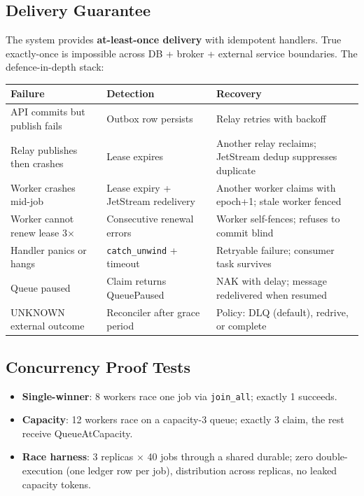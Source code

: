 \documentclass[11pt,a4paper]{article}
\begin{document}
\subsection{Delivery Guarantee}

The system provides \textbf{at-least-once delivery} with idempotent handlers.
True exactly-once is impossible across DB + broker + external service
boundaries. The defence-in-depth stack:

\begin{table}[h]
\centering
\begin{tabular}{p{4.5cm}p{5cm}p{6cm}}
\toprule
\textbf{Failure} & \textbf{Detection} & \textbf{Recovery} \\
\midrule
API commits but publish fails & Outbox row persists & Relay retries with backoff \\
Relay publishes then crashes & Lease expires & Another relay reclaims; JetStream dedup suppresses duplicate \\
Worker crashes mid-job & Lease expiry + JetStream redelivery & Another worker claims with epoch+1; stale worker fenced \\
Worker cannot renew lease 3$\times$ & Consecutive renewal errors & Worker self-fences; refuses to commit blind \\
Handler panics or hangs & \texttt{catch\_unwind} + timeout & Retryable failure; consumer task survives \\
Queue paused & Claim returns QueuePaused & NAK with delay; message redelivered when resumed \\
UNKNOWN external outcome & Reconciler after grace period & Policy: DLQ (default), redrive, or complete \\
\bottomrule
\end{tabular}
\end{table}

\subsection{Concurrency Proof Tests}

\begin{itemize}[nosep]
\item \textbf{Single-winner}: 8 workers race one job via \texttt{join\_all};
exactly 1 succeeds.
\item \textbf{Capacity}: 12 workers race on a capacity-3 queue; exactly 3
claim, the rest receive QueueAtCapacity.
\item \textbf{Race harness}: 3 replicas $\times$ 40 jobs through a shared
durable; zero double-execution (one ledger row per job), distribution across
replicas, no leaked capacity tokens.
\end{itemize}
\end{document}
